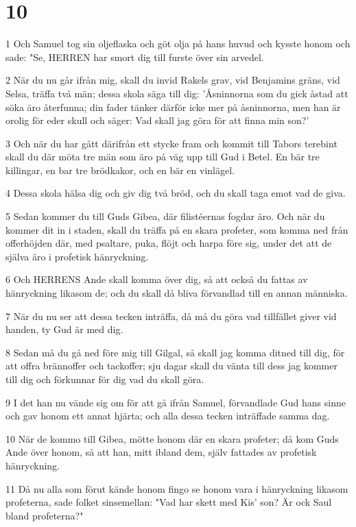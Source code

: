 \chapter{10}

\par 1 Och Samuel tog sin oljeflaska och göt olja på hans huvud och kysste honom och sade: "Se, HERREN har smort dig till furste över sin arvedel.
\par 2 När du nu går ifrån mig, skall du invid Rakels grav, vid Benjamins gräns, vid Selsa, träffa två män; dessa skola säga till dig: 'Åsninnorna som du gick åstad att söka äro återfunna; din fader tänker därför icke mer på åsninnorna, men han är orolig för eder skull och säger: Vad skall jag göra för att finna min son?'
\par 3 Och när du har gått därifrån ett stycke fram och kommit till Tabors terebint skall du där möta tre män som äro på väg upp till Gud i Betel. En bär tre killingar, en bar tre brödkakor, och en bär en vinlägel.
\par 4 Dessa skola hälsa dig och giv dig två bröd, och du skall taga emot vad de giva.
\par 5 Sedan kommer du till Guds Gibea, där filistéernas fogdar äro. Och när du kommer dit in i staden, skall du träffa på en skara profeter, som komma ned från offerhöjden där, med psaltare, puka, flöjt och harpa före sig, under det att de själva äro i profetisk hänryckning.
\par 6 Och HERRENS Ande skall komma över dig, så att också du fattas av hänryckning likasom de; och du skall då bliva förvandlad till en annan människa.
\par 7 När du nu ser att dessa tecken inträffa, då må du göra vad tillfället giver vid handen, ty Gud är med dig.
\par 8 Sedan må du gå ned före mig till Gilgal, så skall jag komma ditned till dig, för att offra brännoffer och tackoffer; sju dagar skall du vänta till dess jag kommer till dig och förkunnar för dig vad du skall göra.
\par 9 I det han nu vände sig om för att gå ifrån Samuel, förvandlade Gud hans sinne och gav honom ett annat hjärta; och alla dessa tecken inträffade samma dag.
\par 10 När de kommo till Gibea, mötte honom där en skara profeter; då kom Guds Ande över honom, så att han, mitt ibland dem, själv fattades av profetisk hänryckning.
\par 11 Då nu alla som förut kände honom fingo se honom vara i hänryckning likasom profeterna, sade folket sinsemellan: "Vad har skett med Kis' son? Är ock Saul bland profeterna?"
